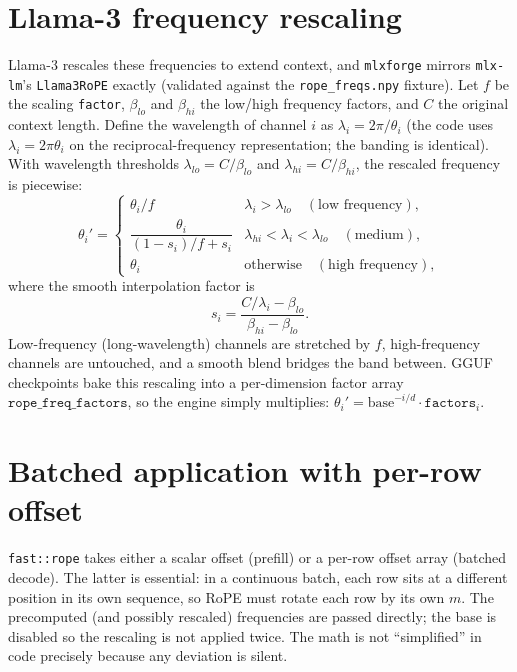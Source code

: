 \documentclass[11pt,a4paper]{report}
\newcommand{\code}[1]{\texttt{#1}}
\begin{document}
\section{Llama-3 frequency rescaling}
Llama-3 rescales these frequencies to extend context, and \code{mlxforge} mirrors
\code{mlx-lm}'s \code{Llama3RoPE} exactly (validated against the
\code{rope\_freqs.npy} fixture). Let $f$ be the scaling \code{factor}, $\beta_{lo}$
and $\beta_{hi}$ the low/high frequency factors, and $C$ the original context
length. Define the wavelength of channel $i$ as $\lambda_i = 2\pi/\theta_i$ (the
code uses $\lambda_i = 2\pi\theta_i$ on the reciprocal-frequency representation; the
banding is identical). With wavelength thresholds
$\lambda_{lo} = C/\beta_{lo}$ and $\lambda_{hi} = C/\beta_{hi}$, the rescaled
frequency is piecewise:
\begin{equation}
  \theta_i' =
  \begin{cases}
    \theta_i / f & \lambda_i > \lambda_{lo} \quad (\text{low frequency}),\\[4pt]
    \dfrac{\theta_i}{(1-s_i)/f + s_i} & \lambda_{hi} < \lambda_i < \lambda_{lo} \quad (\text{medium}),\\[10pt]
    \theta_i & \text{otherwise} \quad (\text{high frequency}),
  \end{cases}
\end{equation}
where the smooth interpolation factor is
\begin{equation}
  s_i = \frac{C/\lambda_i - \beta_{lo}}{\beta_{hi} - \beta_{lo}}.
\end{equation}
Low-frequency (long-wavelength) channels are stretched by $f$, high-frequency
channels are untouched, and a smooth blend bridges the band between. GGUF
checkpoints bake this rescaling into a per-dimension factor array
$\texttt{rope\_freq\_factors}$, so the engine simply multiplies:
$\theta_i' = \text{base}^{-i/d}\cdot \texttt{factors}_i$.

\section{Batched application with per-row offset}
\code{fast::rope} takes either a scalar offset (prefill) or a per-row offset array
(batched decode). The latter is essential: in a continuous batch, each row sits at a
different position in its own sequence, so RoPE must rotate each row by its own
$m$. The precomputed (and possibly rescaled) frequencies are passed directly; the
base is disabled so the rescaling is not applied twice. The math is not
``simplified'' in code precisely because any deviation is silent.
\end{document}
